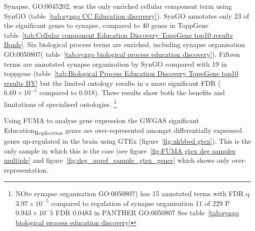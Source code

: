             
 
 
 
 Synapse, GO:0045202, was the only enriched cellular component term using SynGO (table~\ref{tab:syngo CC Education discovery}).
SynGO annotates only 23 of the significant genes to synapse, compared to 40 genes in ToppGene table~\ref{tab:Cellular component Education Discovery ToppGene top10 results Bonfe}. Six biological process terms are enriched,  including synapse organisation GO:0050807( table~\ref{tab:syngo biological process education discovery}). Fifteen terms are annotated synapse organisation by SynGO compared with 19 in toppgene (table~\ref{tab:Biological Process Education Discovery ToppGene top10 results BY} but the limited ontology results in a more significant FDR ($6.69\times10^{-5}$ compared to 0.018). These results show both the benefits and limitations of specialised ontologies.      \footnote{      NOte synapse organisation GO:0050807) has 15 annotated terms with FDR q $3.97\times10^{-5}$ compared to regulation of synapse organisation 11 of 229 P $0.943\times{10^-5}$ FDR 0.0483 in PANTHER GO:0050807
 See table~\ref{tab:syngo biological process education discovery}}

 
 Using FUMA to analyse gene expression the GWGAS significant Education\textsubscript{Replication} genes are over-represented amongst  differentially expressed genes up-regulated in the brain using GTEx (figure~\ref{fig:ukbbed gtex}). This is the only sample in which this is the case (see figure~\ref{fig:FUMA gtex deg samples multiple} and figure~\ref{fig:deg_upref_sample_gtex_gener} which shows only over-representation. 





